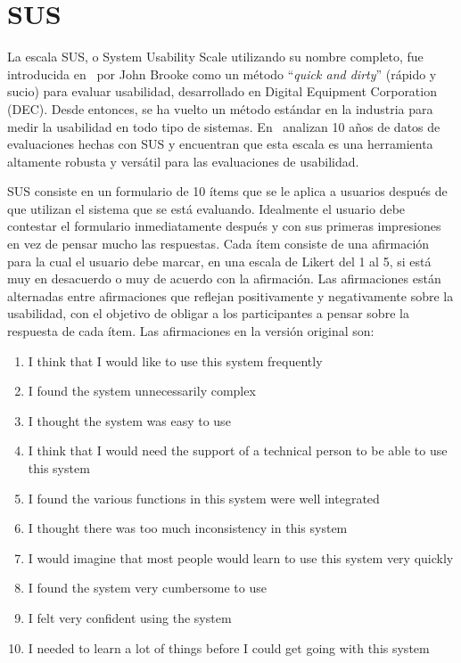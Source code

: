 \section{SUS}
\label{state-of-the-art:sus}

La escala SUS, o System Usability Scale utilizando su nombre completo, fue introducida en~\cite{brooke1996quick} por John Brooke como un método ``\textit{quick and dirty}'' (rápido y sucio) para evaluar usabilidad, desarrollado en Digital Equipment Corporation (DEC). Desde entonces, se ha vuelto un método estándar en la industria para medir la usabilidad en todo tipo de sistemas. En~\cite{evaluation-of-sus} analizan 10 años de datos de evaluaciones hechas con SUS y encuentran que esta escala es una herramienta altamente robusta y versátil para las evaluaciones de usabilidad.

SUS consiste en un formulario de 10 ítems que se le aplica a usuarios después de que utilizan el sistema que se está evaluando. Idealmente el usuario debe contestar el formulario inmediatamente después y con sus primeras impresiones en vez de pensar mucho las respuestas. Cada ítem consiste de una afirmación para la cual el usuario debe marcar, en una escala de Likert del 1 al 5, si está muy en desacuerdo o muy de acuerdo con la afirmación. Las afirmaciones están alternadas entre afirmaciones que reflejan positivamente y negativamente sobre la usabilidad, con el objetivo de obligar a los participantes a pensar sobre la respuesta de cada ítem. Las afirmaciones en la versión original son:
\begin{enumerate}
    \item I think that I would like to use this system frequently
    \item I found the system unnecessarily complex
    \item I thought the system was easy to use
    \item I think that I would need the support of a technical person to be able to use this system
    \item I found the various functions in this system were well integrated
    \item I thought there was too much inconsistency in this system
    \item I would imagine that most people would learn to use this system very quickly
    \item I found the system very cumbersome to use
    \item I felt very confident using the system
    \item I needed to learn a lot of things before I could get going with this system
\end{enumerate}

